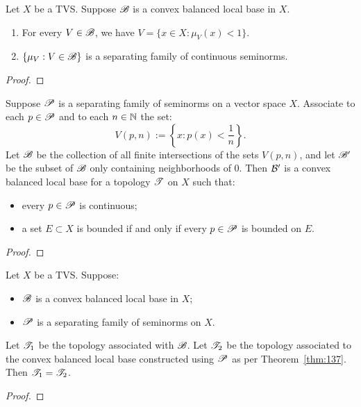 \begin{theorem}
	Let $X$ be a TVS. Suppose $\mathscr{B}$ is a convex balanced local base in $X$.
	\mbox{}
	\begin{enumerate}[label = (\alph*),itemsep=1pt,topsep=3pt]
		\item For every $V \in \mathscr{B}$, we have $V = \{x \in X : \mu_V(x) < 1\}$.
		\item $\{\mu_V : V \in \mathscr{B}\}$ is a separating family of continuous seminorms.
	\end{enumerate}
\end{theorem}
	{\color{red}
	\begin{proof}
			
	\end{proof}}

\begin{theorem}\label{thm:137}
	Suppose $\mathscr{P}$ is a separating family of seminorms on a vector space $X$. Associate to each $p \in \mathscr{P}$ and to each $n \in \mathbb{N}$ the set:
	\[
		V(p,n) := \left\{ x:p(x) < \frac{1}{n} \right\}.
	\] 
	Let $\mathscr{B}$ be the collection of all finite intersections of the sets $V(p,n)$, and let $\mathscr{B}'$ be the subset of $\mathscr{B}$ only containing neighborhoods of $0$. Then $\mathcal{B}'$ is a convex balanced local base for a topology $\mathscr{T}$ on $X$ such that:
	\mbox{}
	\begin{itemize}[itemsep=1pt,topsep=3pt]
		\item every $p \in \mathscr{P}$ is continuous;
		\item a set $E \subset X$ is bounded if and only if every $p \in \mathscr{P}$ is bounded on $E$.
	\end{itemize}
\end{theorem}
	{\color{red}
	\begin{proof}
			
	\end{proof}}

\begin{theorem}
	Let $X$ be a TVS. Suppose:
	\mbox{}
	\begin{itemize}[itemsep=1pt,topsep=3pt]
		\item $\mathscr{B}$ is a convex balanced local base in $X$;
		\item $\mathscr{P}$ is a separating family of seminorms on $X$.
	\end{itemize}
	Let $\mathscr{T}_1$ be the topology associated with $\mathscr{B}$. Let $\mathscr{T}_2$ be the topology associated to the convex balanced local base constructed using $\mathscr{P}$ as per Theorem~\ref{thm:137}. Then $\mathscr{T}_1 = \mathscr{T}_2$.
\end{theorem}
	{\color{red}
	\begin{proof}
			
	\end{proof}}

